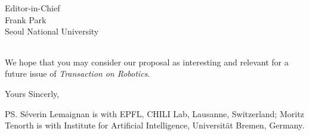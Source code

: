 \documentclass{letter}
\begin{document}
\begin{letter}{Editor-in-Chief \\ Frank Park \\ Seoul National University}
\begin{tabular}{p{2.8cm}p{8cm}p{1.5cm}}
\end{tabular}



We hope that you may consider our proposal as interesting and relevant for a future issue of
\emph{Transaction on Robotics}.

\closing{Yours Sincerly,}

\ps{Séverin Lemaignan is with EPFL, CHILI Lab, Lausanne, Switzerland; Moritz Tenorth is with Institute for Artificial Intelligence, Universität Bremen, Germany.}


\end{letter}



\end{document}
